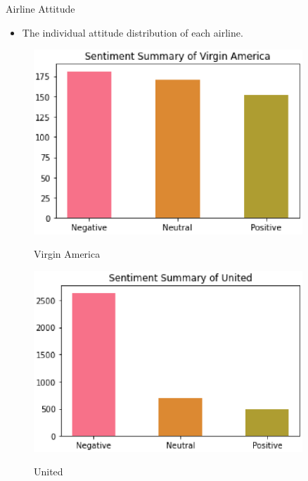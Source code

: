 \documentclass[
 size=14pt,
 paper=smartboard,  %
 mode=present, 		%
 display=slides, 	%
 style=tuliplab,  	%
 pauseslide,
 fleqn,leqno]{powerdot}
\begin{document}
\begin{slide}{Airline Attitude}
  \begin{itemize}
    \item The individual attitude distribution of each airline.
  \end{itemize}
  \begin{figure}[htbp]
    \centering
    \begin{minipage}[t]{0.48\textwidth}
      \centering
      \includegraphics[width=0.9\textwidth]{figures//virgin.eps}\\
      \vspace{-1.4em}
      \caption{Virgin America}
    \end{minipage}
    \begin{minipage}[t]{0.48\textwidth}
      \centering
      \includegraphics[width=0.9\textwidth]{figures//united.eps}\\
      \vspace{-1.4em}
      \caption{United}
    \end{minipage}
  \end{figure}
\end{slide}
\end{document}
